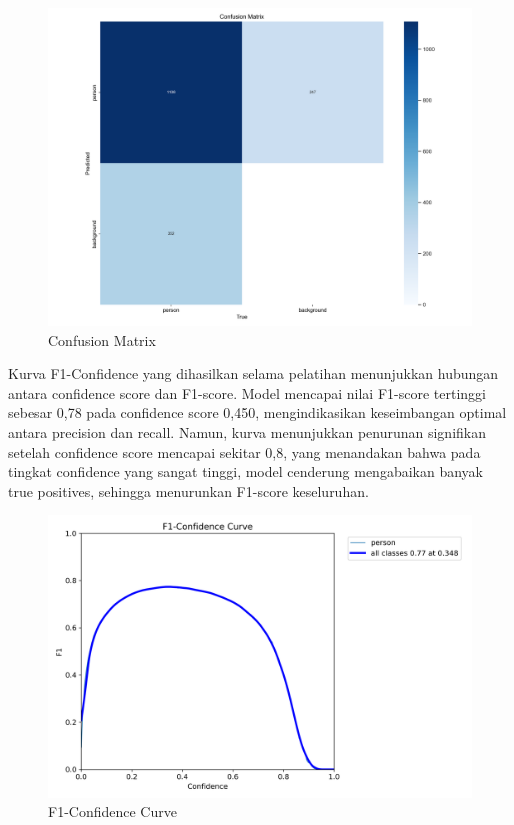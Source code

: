 \begin{figure}[H]
    \centering
    \includegraphics[scale=0.4]{gambar/confusion_matrix.png}
    \caption{Confusion Matrix}
    \label{fig:Confusion Matrix}
\end{figure}

Kurva F1-Confidence yang dihasilkan selama pelatihan menunjukkan hubungan antara confidence score dan F1-score. Model mencapai nilai F1-score tertinggi sebesar 0,78 pada confidence score 0,450, mengindikasikan keseimbangan optimal antara precision dan recall. Namun, kurva menunjukkan penurunan signifikan setelah confidence score mencapai sekitar 0,8, yang menandakan bahwa pada tingkat confidence yang sangat tinggi, model cenderung mengabaikan banyak true positives, sehingga menurunkan F1-score keseluruhan.

\begin{figure}[H]
    \centering
    \includegraphics[scale=0.4]{gambar/F1_curve.png}
    \caption{F1-Confidence Curve}
    \label{fig:F1-Confidence Curve}
\end{figure}

